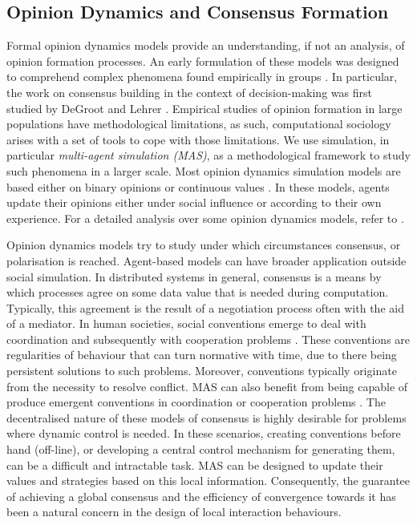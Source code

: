 \documentclass[preprint,number]{elsarticle}
\begin{document}
	\subsection{Opinion Dynamics and Consensus Formation}
	Formal opinion dynamics models provide an understanding, if not an analysis, of opinion formation processes.  An early formulation of these models was designed to comprehend complex phenomena found empirically in groups \cite{French1956}. In particular, the work on consensus building in the context of decision-making was first studied by DeGroot \cite{Degroot74} and Lehrer \cite{Lehrer1975}. Empirical studies of opinion formation in large populations have methodological limitations, as such, computational sociology arises with a set of tools to cope with those limitations. We use simulation, in particular \textit{multi-agent simulation (MAS)}, as a methodological framework to study such phenomena in a larger scale. Most opinion dynamics simulation models are based either on binary opinions \cite{Galam1997,Antunes2009} or continuous values \cite{Deffuant2000,Deffuant2002}. In these models, agents update their opinions either under social influence or according to their own experience. For a detailed analysis over some opinion dynamics models, refer to \cite{Hegselmann2002}. 
	
	Opinion dynamics models try to study under which circumstances consensus, or polarisation is reached. Agent-based models can have broader application outside social simulation. In distributed systems in general, consensus is a means by which processes agree on some data value that is needed during computation. Typically, this agreement is the result of a negotiation process often with the aid of a mediator. In human societies, social conventions emerge to deal with coordination and subsequently with cooperation problems \cite{Lewis1969}. These conventions are regularities of behaviour that can turn normative with time, due to there being persistent solutions to such problems. Moreover, conventions typically originate from the necessity to resolve conflict. MAS can also benefit from being capable of produce emergent conventions in coordination or cooperation problems \cite{Delgado2002}. The decentralised nature of these models of consensus is highly desirable for problems where dynamic control is needed. In these scenarios, creating conventions before hand (off-line), or developing a central control mechanism for generating them, can be a difficult and intractable task. MAS can be designed to update their values and strategies based on this local information. Consequently, the guarantee of achieving a global consensus and the efficiency of convergence towards it has been a natural concern in the design of local interaction behaviours. 
	
\end{document}
